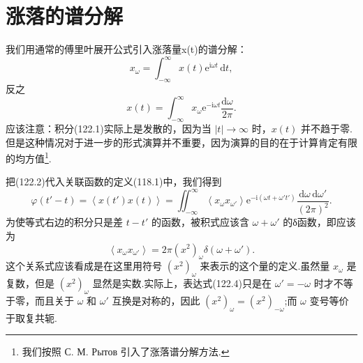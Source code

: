 \section{涨落的谱分解}

我们用通常的傅里叶展开公式引入涨落量x(t)的谱分解：
\begin{equation}
  x_\omega=\int_{-\infty}^{\infty}x(t)\mathrm{e}^{\mathrm{i}\omega t}\,\mathrm{d}t,
\end{equation}
反之
\begin{equation}
  x(t)=\int_{-\infty}^{\infty}x_\omega\mathrm{e}^{-\mathrm{i}\omega t}
  \frac{\mathrm{d}\omega}{2\pi}.
\end{equation}
应该注意：积分(122.1)实际上是发散的，因为当 $|t|\to\infty$ 时，$x(t)$ 并不趋于零.但是这种情况对于进一步的形式演算并不重要，因为演算的目的在于计算肯定有限的均方值\footnote{我们按照 С. М. Рытов 引入了涨落谱分解方法.}.

把(122.2)代入关联函数的定义(118.1)中，我们得到
\begin{equation}
  \varphi(t'-t)=\left\langle x(t')x(t)\right\rangle
  =\iint_{-\infty}^{\infty}\left\langle x_\omega x_{\omega'}\right\rangle
  \mathrm{e}^{-\mathrm{i}(\omega t+\omega't')}
  \frac{\mathrm{d}\omega\,\mathrm{d}\omega'}{(2\pi)^2}.
\end{equation}
为使等式右边的积分只是差 $t-t'$ 的函数，被积式应该含 $\omega+\omega'$ 的δ函数，即应该为
\begin{equation}
  \left\langle x_\omega x_{\omega'}\right\rangle
  =2\pi(x^2)_\omega\delta(\omega+\omega').
\end{equation}
这个关系式应该看成是在这里用符号 $(x^2)_\omega$ 来表示的这个量的定义.虽然量 $x_\omega$ 是复数，但是 $(x^2)_\omega$ 显然是实数.实际上，表达式(122.4)只是在 $\omega'=-\omega$ 时才不等于零，而且关于 $\omega$ 和 $\omega'$ 互换是对称的，因此 $(x^2)_\omega=(x^2)_{-\omega}$;而 $\omega$ 变号等价于取复共轭.

